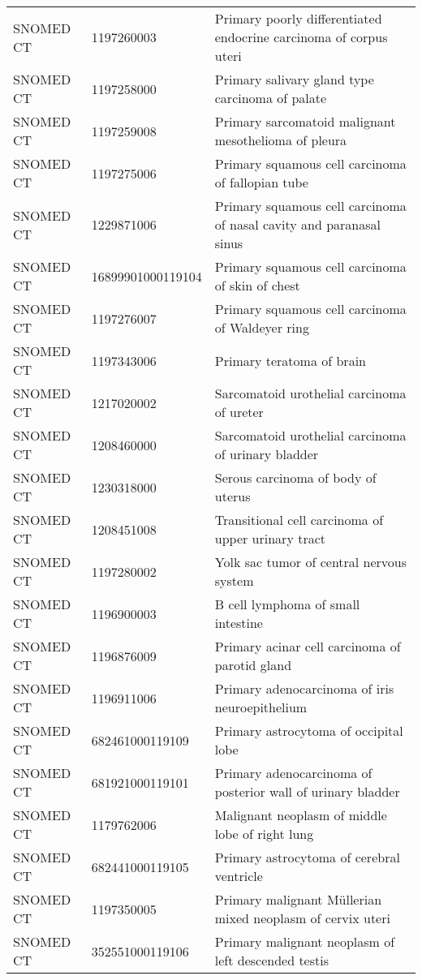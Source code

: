 \begin{longtable}{p{}p{}p{}}
  SNOMED CT & 1197260003 & Primary poorly differentiated endocrine carcinoma of corpus uteri \\ 
  SNOMED CT & 1197258000 & Primary salivary gland type carcinoma of palate \\ 
  SNOMED CT & 1197259008 & Primary sarcomatoid malignant mesothelioma of pleura \\ 
  SNOMED CT & 1197275006 & Primary squamous cell carcinoma of fallopian tube \\ 
  SNOMED CT & 1229871006 & Primary squamous cell carcinoma of nasal cavity and paranasal sinus \\ 
  SNOMED CT & 16899901000119104 & Primary squamous cell carcinoma of skin of chest \\ 
  SNOMED CT & 1197276007 & Primary squamous cell carcinoma of Waldeyer ring \\ 
  SNOMED CT & 1197343006 & Primary teratoma of brain \\ 
  SNOMED CT & 1217020002 & Sarcomatoid urothelial carcinoma of ureter \\ 
  SNOMED CT & 1208460000 & Sarcomatoid urothelial carcinoma of urinary bladder \\ 
  SNOMED CT & 1230318000 & Serous carcinoma of body of uterus \\ 
  SNOMED CT & 1208451008 & Transitional cell carcinoma of upper urinary tract \\ 
  SNOMED CT & 1197280002 & Yolk sac tumor of central nervous system \\ 
  SNOMED CT & 1196900003 & B cell lymphoma of small intestine \\ 
  SNOMED CT & 1196876009 & Primary acinar cell carcinoma of parotid gland \\ 
  SNOMED CT & 1196911006 & Primary adenocarcinoma of iris neuroepithelium \\ 
  SNOMED CT & 682461000119109 & Primary astrocytoma of occipital lobe \\ 
  SNOMED CT & 681921000119101 & Primary adenocarcinoma of posterior wall of urinary bladder \\ 
  SNOMED CT & 1179762006 & Malignant neoplasm of middle lobe of right lung \\ 
  SNOMED CT & 682441000119105 & Primary astrocytoma of cerebral ventricle \\ 
  SNOMED CT & 1197350005 & Primary malignant Müllerian mixed neoplasm of cervix uteri \\ 
  SNOMED CT & 352551000119106 & Primary malignant neoplasm of left descended testis \\ 

\end{longtable}
